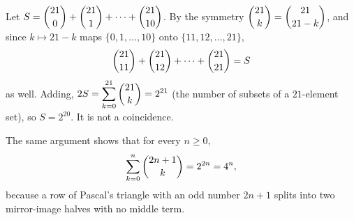 Let $S=\dbinom{21}{0}+\dbinom{21}{1}+\cdots+\dbinom{21}{10}$. By the symmetry $\dbinom{21}{k}=\dbinom{21}{21-k}$, and since $k\mapsto21-k$ maps $\{0,1,\dots,10\}$ onto $\{11,12,\dots,21\}$,
\[\dbinom{21}{11}+\dbinom{21}{12}+\cdots+\dbinom{21}{21}=S\]
as well. Adding, $2S=\displaystyle\sum_{k=0}^{21}\dbinom{21}{k}=2^{21}$ (the number of subsets of a $21$-element set), so $S=2^{20}$. It is not a coincidence.

The same argument shows that for every $n\ge0$,
\[\sum_{k=0}^{n}\dbinom{2n+1}{k}=2^{2n}=4^n,\]
because a row of Pascal's triangle with an odd number $2n+1$ splits into two mirror-image halves with no middle term.
